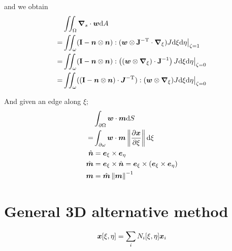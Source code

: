 \documentclass[a4paper,11pt]{article}
\renewcommand{\to}[1]{\text{\boldmath $#1$}} %
\newcommand{\ts}[1]{\text{\boldmath $\mathrm{#1}$}} %
\newcommand{\intd}[1]{\mathrm{d}#1}
\newcommand{\pderiv}[2]{\frac{\partial#1}{\partial#2}}
\newcommand{\norm}[1]{\left\lVert{#1}\right\rVert}
\newcommand{\T}{\mathrm{T}}
\begin{document}

and we obtain
\begin{align}
 &\iint_\Omega\to \nabla_s\cdot\to w\intd A\\
=&\iint_\omega(\ts I-\to n\otimes\to n):(\to w\otimes \ts J^{-\T}\cdot\to\nabla_\xi)J\intd\xi\intd\eta\big|_{\zeta=1}\\
=&\iint_\omega(\ts I-\to n\otimes\to n):\left((\to w\otimes\to\nabla_\xi) \cdot\ts J^{-1}\right)J\intd\xi\intd\eta\big|_{\zeta=0}\\
=&\iint_\omega((\ts I-\to n\otimes\to n)\cdot\to J^{-\T}):(\to w\otimes\to\nabla_\xi)J\intd\xi\intd\eta\big|_{\zeta=0}
\end{align}

And given an edge along $\xi$;
\begin{align}
 &\int_{\partial\Omega}\to w\cdot\to m\intd S\\
=&\int_{\partial\omega}\to w\cdot\to m\norm{\pderiv{\to x}{\xi}}\intd \xi\\
 \hat{\to n} &= \to e_\xi \times \to e_\eta\\
 \hat{\to m} &= \to e_\xi \times \hat{\to n} = \to e_\xi\times (\to e_\xi \times \to e_\eta)\\
 \to m &= \hat{\to m}\norm{\to m}^{-1}
\end{align}


\section{General 3D alternative method}
\begin{align}
 \to x[\xi,\eta] = \sum_i N_i[\xi,\eta]\to x_i
\end{align}
\end{document}
